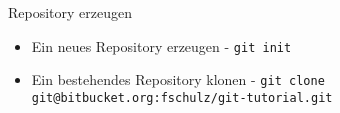 \begin{frame}{Repository erzeugen}
\begin{tiny}
\begin{itemize}
\item Ein neues Repository erzeugen - \pause \texttt{git init}
\pause \item Ein bestehendes Repository klonen - \texttt{git clone git@bitbucket.org:fschulz/git-tutorial.git}
\end{itemize}
\end{tiny}
\end{frame}

